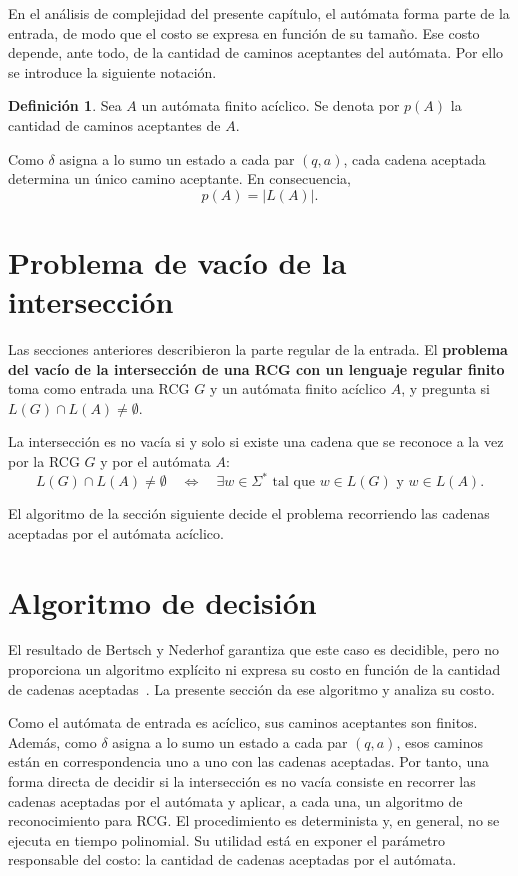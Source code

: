 \documentclass{report}
\theoremstyle{definition}
\newtheorem{definicion}{Definición}[chapter]
\theoremstyle{plain}
\theoremstyle{remark}
\begin{document}
En el análisis de complejidad del presente capítulo, el autómata forma
parte de la entrada, de modo que el costo se expresa en función de su
tamaño. Ese costo depende, ante todo, de la cantidad de caminos
aceptantes del autómata. Por ello se introduce la siguiente notación.

\begin{definicion}
  Sea $A$ un autómata finito acíclico. Se denota por $p(A)$ la cantidad
  de caminos aceptantes de $A$.
\end{definicion}

Como $\delta$ asigna a lo sumo un estado a cada par $(q,a)$, cada
cadena aceptada determina un único camino aceptante. En consecuencia,
\[
  p(A)=|L(A)|.
\]

\section{Problema de vacío de la intersección}
\label{sec:problema-vacio-interseccion}

Las secciones anteriores describieron la parte regular de la entrada. El
\textbf{problema del vacío de la intersección de una RCG con un lenguaje
  regular finito} toma como entrada una RCG $G$ y un autómata
finito acíclico $A$, y pregunta si $L(G) \cap L(A) \neq \emptyset$.

La intersección es no vacía si y solo si existe una cadena que se
reconoce a la vez por la RCG $G$ y por el autómata $A$:
\[
  L(G) \cap L(A) \neq \emptyset
  \quad \Longleftrightarrow \quad
  \exists w \in \Sigma^* \text{ tal que } w \in L(G) \text{ y } w \in L(A).
\]

El algoritmo de la sección siguiente decide el problema recorriendo las
cadenas aceptadas por el autómata acíclico.

\section{Algoritmo de decisión}
\label{sec:algoritmo-decision}

El resultado de Bertsch y Nederhof garantiza que este caso es decidible,
pero no proporciona un algoritmo explícito ni expresa su costo en función
de la cantidad de cadenas aceptadas~\cite{bertsch2001rcg}. La presente
sección da ese algoritmo y analiza su costo.

Como el autómata de entrada es acíclico, sus caminos aceptantes son
finitos. Además, como $\delta$ asigna a lo sumo un estado a cada par
$(q,a)$, esos caminos están en correspondencia uno a uno con las
cadenas aceptadas. Por tanto, una
forma directa de decidir si la intersección es no vacía consiste en
recorrer las cadenas aceptadas por el autómata y aplicar, a cada una, un
algoritmo de reconocimiento para RCG. El procedimiento es
determinista y, en general, no se ejecuta en tiempo polinomial. Su utilidad está en
exponer el parámetro responsable del costo: la cantidad de cadenas
aceptadas por el autómata.
\end{document}
